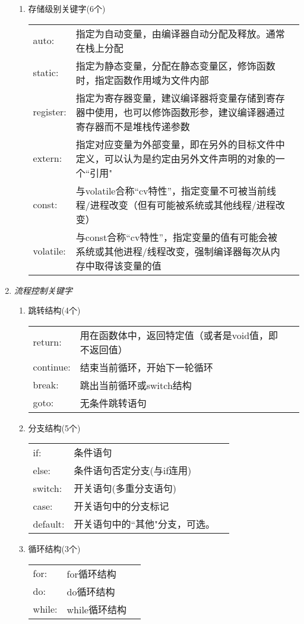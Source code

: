 \begin{enumerate}[label=\arabic*)]
\begin{enumerate}[label=\arabic*)]
		\item 存储级别关键字(6个)
		\begin{tabular}{lp{4.5cm} l}
			auto: & 指定为自动变量，由编译器自动分配及释放。通常在栈上分配 \\ 
			static: & 指定为静态变量，分配在静态变量区，修饰函数时，指定函数作用域为文件内部 \\ 
			register: & 指定为寄存器变量，建议编译器将变量存储到寄存器中使用，也可以修饰函数形参，建议编译器通过寄存器而不是堆栈传递参数 \\ 
			extern: & 指定对应变量为外部变量，即在另外的目标文件中定义，可以认为是约定由另外文件声明的对象的一个``引用" \\ 
			const: & 与volatile合称“cv特性”，指定变量不可被当前线程/进程改变（但有可能被系统或其他线程/进程改变） \\ 
			volatile: & 与const合称“cv特性”，指定变量的值有可能会被系统或其他进程/线程改变，强制编译器每次从内存中取得该变量的值 \\ 
		\end{tabular}	
	\end{enumerate}

	\item \emph{流程控制关键字}
	\begin{enumerate}[label=\arabic*)]
		\item 跳转结构(4个)
		\begin{tabular}{lp{4.5cm} l}
			return: & 用在函数体中，返回特定值（或者是void值，即不返回值） \\ 
			continue: & 结束当前循环，开始下一轮循环 \\ 
			break: & 跳出当前循环或switch结构 \\ 
			goto: & 无条件跳转语句 \\ 
		\end{tabular}
		
		\item 分支结构(5个)
		\begin{tabular}{lp{4.5cm} l}
			if: & 条件语句 \\ 
			else: & 条件语句否定分支(与if连用) \\ 
			switch: & 开关语句(多重分支语句) \\ 
			case: & 开关语句中的分支标记 \\ 
			default: & 开关语句中的``其他"分支，可选。 \\ 
		\end{tabular}

		\item 循环结构(3个)
		\begin{tabular}{lp{4.5cm} l}
			for: & for循环结构 \\ 
			do: & do循环结构 \\ 
			while: & while循环结构
		\end{tabular}
	\end{enumerate}
\end{enumerate}










